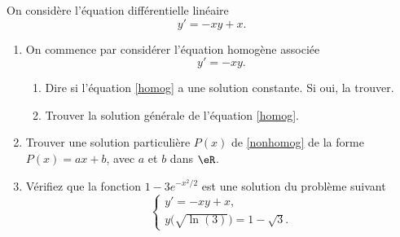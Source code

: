 
\begin{exercice}\label{exoExamenDecembre2010-0005}

On considère l'équation différentielle linéaire 
\begin{equation}\label{nonhomog}
  y'=-xy+x.
\end{equation}
\begin{enumerate}
\item On commence par considérer l'équation homogène associée
  \begin{equation}\label{homog}
    y'=-xy.
  \end{equation}
  \begin{enumerate}
  \item Dire si l'équation \eqref{homog} a une solution constante. Si oui, la trouver. 
  \item Trouver la solution générale de l'équation \eqref{homog}.
  \end{enumerate}
\item  Trouver  une solution particulière $P(x)$ de \eqref{nonhomog} de la forme $P(x)=ax+b$, avec $a$ et $b$ dans $\eR$. 
\item Vérifiez que la fonction $1-3e^{-x^2/2}$ est une solution du problème suivant
  \begin{equation}
    \left\{\begin{array}{l}
      y'=-xy+x,\\
      y\big(\sqrt{\ln(3)}\big)= 1-\sqrt{3}.
    \end{array}\right.
  \end{equation}
\end{enumerate}


\end{exercice}
